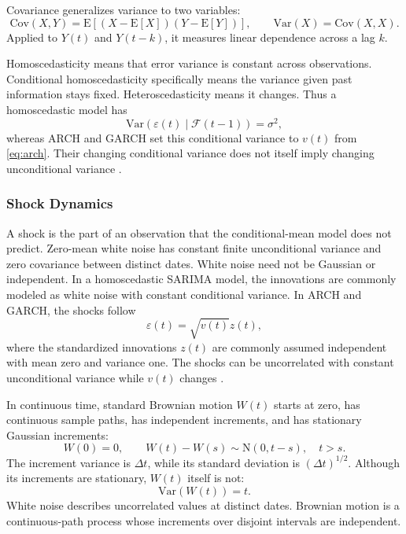 \documentclass[12pt,a4paper]{article}
\numberwithin{equation}{section}
\numberwithin{table}{section}
\numberwithin{figure}{section}
\begin{document}
Covariance generalizes variance to two variables:
\begin{equation}\label{eq:covariance}
\mathrm{Cov}(X,Y)=\mathrm{E}[(X-\mathrm{E}[X])(Y-\mathrm{E}[Y])],
\qquad \mathrm{Var}(X)=\mathrm{Cov}(X,X).
\end{equation}
Applied to $Y(t)$ and $Y(t-k)$, it measures linear dependence across a lag $k$.

Homoscedasticity means that error variance is constant across observations. Conditional homoscedasticity specifically means the variance given past information stays fixed. Heteroscedasticity means it changes. Thus a homoscedastic model has
\begin{equation}\label{eq:homoscedasticity}
\mathrm{Var}(\varepsilon(t)\mid\mathcal{F}(t-1))=\sigma^2,
\end{equation}
whereas ARCH and GARCH set this conditional variance to $v(t)$ from \eqref{eq:arch}. Their changing conditional variance does not itself imply changing unconditional variance \cite{engle1982,bollerslev1986}.

\subsubsection{Shock Dynamics}
A shock is the part of an observation that the conditional-mean model does not predict. Zero-mean white noise has constant finite unconditional variance and zero covariance between distinct dates. White noise need not be Gaussian or independent. In a homoscedastic SARIMA model, the innovations are commonly modeled as white noise with constant conditional variance. In ARCH and GARCH, the shocks follow
\begin{equation}\label{eq:garch-shock}
\varepsilon(t)=\sqrt{v(t)}z(t),
\end{equation}
where the standardized innovations $z(t)$ are commonly assumed independent with mean zero and variance one. The shocks can be uncorrelated with constant unconditional variance while $v(t)$ changes \cite{boxjenkins1970,engle1982,bollerslev1986}.

In continuous time, standard Brownian motion $W(t)$ starts at zero, has continuous sample paths, has independent increments, and has stationary Gaussian increments:
\begin{equation}\label{eq:brownian-increments}
W(0)=0,\qquad W(t)-W(s)\sim\mathrm{N}(0,t-s),\quad t>s.
\end{equation}
The increment variance is $\Delta t$, while its standard deviation is $(\Delta t)^{1/2}$. Although its increments are stationary, $W(t)$ itself is not:
\begin{equation}\label{eq:brownian-variance}
\mathrm{Var}(W(t))=t.
\end{equation}
White noise describes uncorrelated values at distinct dates. Brownian motion is a continuous-path process whose increments over disjoint intervals are independent.
\end{document}
